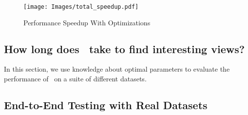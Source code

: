 \begin{figure}[h]
  \centering
    \texttt{[image: Images/total\_speedup.pdf]}
  \caption{Performance Speedup With Optimizations} 
  \label{fig:total_speed_up}
\end{figure}

\subsection{How long does \VizRecDB\ take to find interesting views?}

In this section, we use knowledge about optimal parameters to evaluate the
performance of \VizRecDB\ on a suite of different datasets.

\subsection{End-to-End Testing with Real Datasets}
